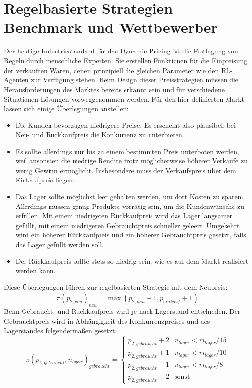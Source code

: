 \section{Regelbasierte Strategien -- Benchmark und Wettbewerber}
\label{section:rulebased}
Der heutige Industriestandard für das Dynamic Pricing ist die Festlegung von Regeln durch menschliche Experten.
Sie erstellen Funktionen für die Einpreisung der verkauften Waren, denen prinzipiell die gleichen Parameter wie den RL-Agenten zur Verfügung stehen.
Beim Design dieser Preisstrategien müssen die Herausforderungen des Marktes bereits erkannt sein und für verschiedene Situationen Lösungen vorweggenommen werden.
Für den hier definierten Markt lassen sich einige Überlegungen anstellen:
\begin{itemize}
	\item Die Kunden bevorzugen niedrigere Preise.
	Es erscheint also plausibel, bei Neu- und Rückkaufpreis die Konkurrenz zu unterbieten.
	\item Es sollte allerdings nur bis zu einem bestimmten Preis unterboten werden, weil ansonsten die niedrige Rendite trotz möglicherweise höherer Verkäufe zu wenig Gewinn ermöglicht.
	Insbesondere muss der Verkaufspreis über dem Einkaufpreis liegen.
	\item Das Lager sollte möglichst leer gehalten werden, um dort Kosten zu sparen.
	Allerdings müssen genug Produkte vorrätig sein, um die Kundenwünsche zu erfüllen.
	Mit einem niedrigeren Rückkaufpreis wird das Lager langsamer gefüllt, mit einem niedrigeren Gebrauchtpreis schneller geleert.
	Umgekehrt wird ein höherer Rückkaufpreis und ein höherer Gebrauchtpreis gesetzt, falls das Lager gefüllt werden soll.
	\item Der Rückkaufpreis sollte stets so niedrig sein, wie es auf dem Markt realisiert werden kann.
\end{itemize}
Diese Überlegungen führen zur regelbasierten Strategie mit dem Neupreis:
\begin{equation}
	\pi\left(p_{2, neu}\right)_{neu} = \max{\left(p_{2, neu} - 1, p_{einkauf} + 1\right)}
\end{equation}
Beim Gebraucht- und Rückkaufpreis wird je nach Lagerstand entschieden.
Der Gebrauchtpreis wird in Abhängigkeit des Konkurrenzpreises und des Lagerstandes folgendermaßen gesetzt:
\begin{equation}
	\pi\left(p_{2, gebraucht}, n_{lager}\right)_{gebraucht} =
	\begin{cases}
		p_{2, gebraucht} + 2 & n_{lager} < m_{lager} / 15\\
		p_{2, gebraucht} + 1 & n_{lager} < m_{lager} / 10\\
		p_{2, gebraucht} - 1 & n_{lager} < m_{lager} / 8\\
		p_{2, gebraucht} - 2 & \text{sonst}
	\end{cases}
\end{equation}
